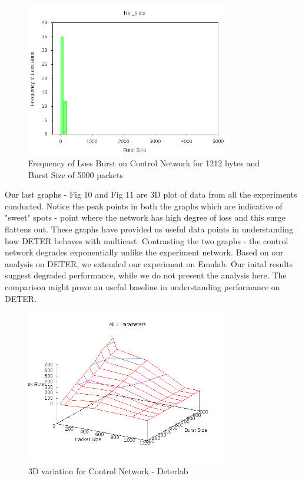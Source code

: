 \documentclass[11pt]{article}
\begin{document}
\begin{figure}[!ht]
\centering
\includegraphics[width=0.8\textwidth]{seq1200.png}
\caption{Frequency of Loss Burst on Control Network for 1212 bytes and Burst Size of 5000 packets}
\end{figure}
\FloatBarrier
Our last graphs - Fig 10 and Fig 11 are 3D plot of data from all the experiments conducted. Notice the peak points in both the graphs which are indicative of "sweet" spots - point where the network has high degree of loss and this surge flattens out. These graphs have provided us useful data points in understanding how DETER behaves with multicast. Contrasting the two graphs - the control network degrades exponentially unlike the experiment network. Based on our analysis on DETER, we extended our experiment on Emulab. Our inital results suggest degraded performance, while we do not present the analysis here. The comparison might prove an useful baseline in understanding performance on DETER.
\begin{figure}[!ht]
\centering
\includegraphics[width=0.8\textwidth]{control.png}
\caption{3D variation for Control Network - Deterlab}
\end{figure}
\end{document}
